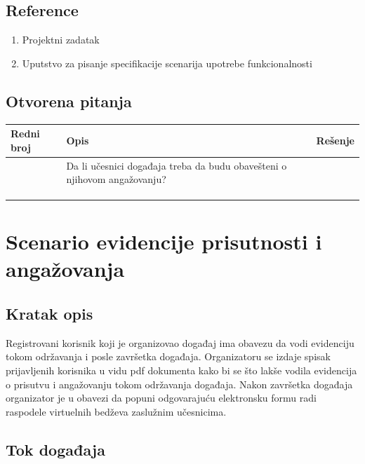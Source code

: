 \documentclass[11pt,a4paper]{article}
\begin{document}
\subsection{Reference}
\begin{enumerate}
    \item Projektni zadatak
    \item Uputstvo za pisanje specifikacije scenarija upotrebe funkcionalnosti
\end{enumerate}
\subsection{Otvorena pitanja}
\begin{center}
\begin{tabular}{| >{\centering\arraybackslash}m{1.9cm} | >{\centering\arraybackslash}m{4.9cm} | >{\centering\arraybackslash}m{4.9cm} |}
\hline
\rowcolor[HTML]{000000} 
{\color[HTML]{FFFFFF} Redni broj } & {\color[HTML]{FFFFFF} Opis } & {\color[HTML]{FFFFFF} Rešenje } \\ \hline
1 & Da li učesnici događaja treba da budu obavešteni o njihovom angažovanju? & \\ \hline
 &  &  \\ \hline
 &  &  \\ \hline
 &  &  \\ \hline
\end{tabular}
\end{center}

\newpage

\section{Scenario evidencije prisutnosti i angažovanja}
\subsection{Kratak opis}
Registrovani korisnik koji je organizovao događaj ima obavezu da vodi evidenciju tokom održavanja i posle završetka događaja. Organizatoru se izdaje spisak prijavljenih korisnika u vidu pdf dokumenta kako bi se što lakše vodila evidencija o prisutvu i angažovanju tokom održavanja događaja. Nakon završetka događaja organizator je u obavezi da popuni odgovarajuću elektronsku formu radi raspodele virtuelnih bedževa zaslužnim učesnicima.
\subsection{Tok događaja}
\end{document}

